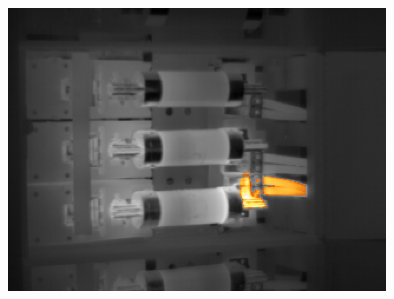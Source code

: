 \documentclass[12pt,twoside,a4paper,titlepage]{report}
\begin{document}
\begin{figure}[ht]
 \centering
 \includegraphics[width=10cm, keepaspectratio=true width=10cm]{img/FLIR_P60_hl_p}

\end{figure}
\end{document}
